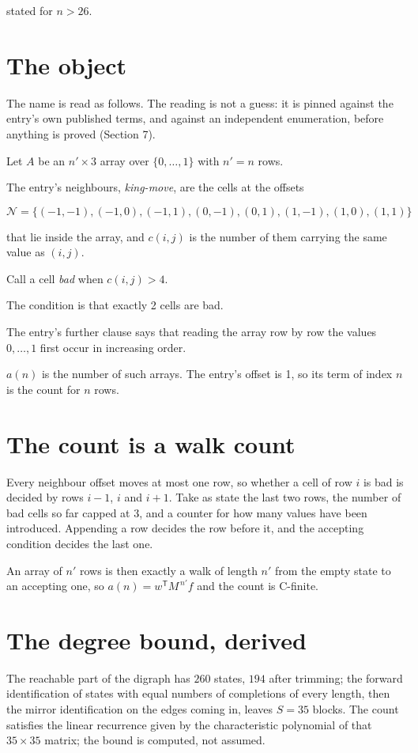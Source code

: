 \documentclass[11pt]{article}
\theoremstyle{definition}
\begin{document}
stated for $n > 26$.

\section{The object}

The name is read as follows. The reading is not a guess: it is pinned against the entry's own published terms, and against an independent enumeration, before anything is proved (Section 7).

Let $A$ be an $n' \times 3$ array over $\{0,\dots,1\}$ with $n' = n$ rows.

The entry's neighbours, {\itshape king-move}, are the cells at the offsets

\[\mathcal{N} = \{(-1,-1), (-1,0), (-1,1), (0,-1), (0,1), (1,-1), (1,0), (1,1)\}\]

that lie inside the array, and $c(i,j)$ is the number of them carrying the same value as $(i,j)$.

Call a cell {\itshape bad} when $c(i,j) > 4$.

The condition is that exactly 2 cells are bad.

The entry's further clause says that reading the array row by row the values $0,\dots,1$ first occur in increasing order.

$a(n)$ is the number of such arrays. The entry's offset is 1, so its term of index $n$ is the count for $n$ rows.

\section{The count is a walk count}

Every neighbour offset moves at most one row, so whether a cell of row $i$ is bad is decided by rows $i-1$, $i$ and $i+1$. Take as state the last two rows, the number of bad cells so far capped at 3, and a counter for how many values have been introduced. Appending a row decides the row before it, and the accepting condition decides the last one.

An array of $n'$ rows is then exactly a walk of length $n'$ from the empty state to an accepting one, so $a(n) = w^{\mathsf T}M^{\,n'}f$ and the count is C-finite.

\section{The degree bound, derived}

The reachable part of the digraph has $260$ states, $194$ after trimming; the forward identification of states with equal numbers of completions of every length, then the mirror identification on the edges coming in, leaves $S = 35$ blocks. The count satisfies the linear recurrence given by the characteristic polynomial of that $35\times35$ matrix; the bound is computed, not assumed.
\end{document}
